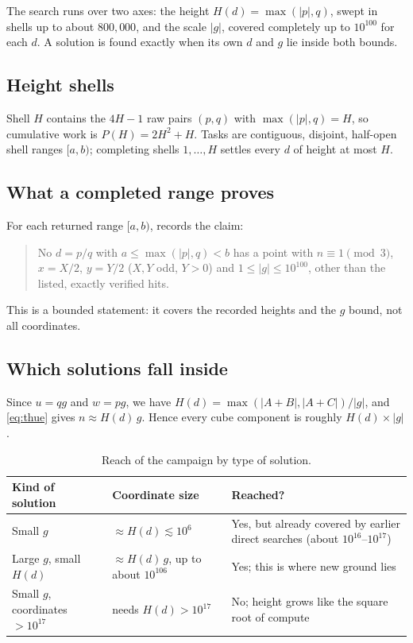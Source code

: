 \documentclass[11pt,a4paper]{article}
\newcommand{\code}[1]{\path{#1}}
\begin{document}
The search runs over two axes: the height $H(d)=\max(|p|,q)$, swept in shells up to about
$800{,}000$, and the scale $|g|$, covered completely up to $10^{100}$ for each $d$. A
solution is found exactly when its own $d$ and $g$ lie inside both bounds.

\subsection{Height shells}
Shell $H$ contains the $4H-1$ raw pairs $(p,q)$ with $\max(|p|,q)=H$, so cumulative work is
$P(H)=2H^2+H$. Tasks are contiguous, disjoint, half-open shell ranges $[a,b)$; completing
shells $1,\dots,H$ settles every $d$ of height at most $H$.

\subsection{What a completed range proves}
For each returned range $[a,b)$, \code{collect_d.py} records the claim:
\begin{quote}
No $d=p/q$ with $a\le\max(|p|,q)<b$ has a point with $n\equiv1\pmod3$, $x=X/2$, $y=Y/2$
($X,Y$ odd, $Y>0$) and $1\le|g|\le10^{100}$, other than the listed, exactly verified hits.
\end{quote}
This is a bounded statement: it covers the recorded heights and the $g$ bound, not all
coordinates.

\subsection{Which solutions fall inside}
Since $u=qg$ and $w=pg$, we have $H(d)=\max(|A+B|,|A+C|)/|g|$, and \eqref{eq:thue} gives
$n\approx H(d)\,g$. Hence every cube component is roughly $H(d)\times|g|$.

\begin{table}[h]
\centering\small
\caption{Reach of the campaign by type of solution.}
\begin{tabularx}{\textwidth}{>{\raggedright\arraybackslash}p{}>{\raggedright\arraybackslash}p{}Y}
\toprule
Kind of solution & Coordinate size & Reached? \\
\midrule
Small $g$ & $\approx H(d)\lesssim10^6$ & Yes, but already covered by earlier direct searches (about $10^{16}$--$10^{17}$) \\
Large $g$, small $H(d)$ & $\approx H(d)\,g$, up to about $10^{106}$ & Yes; this is where new ground lies \\
Small $g$, coordinates $>10^{17}$ & needs $H(d)>10^{17}$ & No; height grows like the square root of compute \\
\bottomrule
\end{tabularx}
\end{table}
\end{document}
